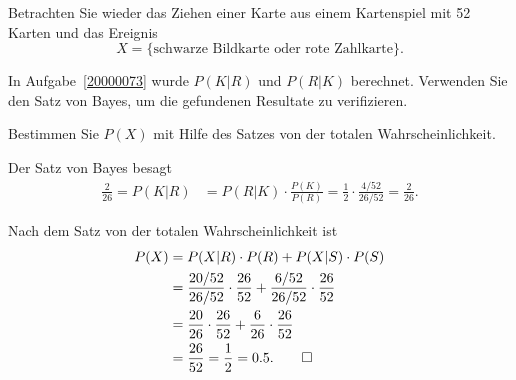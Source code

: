 Betrachten Sie wieder das Ziehen einer Karte aus einem Kartenspiel
mit 52 Karten und das Ereignis
\[
X
=
\{
\text{schwarze Bildkarte oder rote Zahlkarte}
\}.
\]

\begin{teilaufgaben}
\item
In Aufgabe~\ref{20000073} wurde $P(K|R)$ und $P(R|K)$ berechnet.
Verwenden Sie den Satz von Bayes, um die gefundenen Resultate zu
verifizieren.
\item
Bestimmen Sie $P(X)$ mit Hilfe des Satzes von der totalen Wahrscheinlichkeit.
\end{teilaufgaben}

\begin{loesung}
\begin{teilaufgaben}
\item
Der Satz von Bayes besagt
\begin{align*}
\frac{2}{26}
=
P(K|R)
&=
P(R|K)\cdot \frac{P(K)}{P(R)}
=
\frac{1}{2}
\cdot
\frac{4/52}{26/52}
=
\frac{2}{26}.
\end{align*}
\item
Nach dem Satz von der totalen Wahrscheinlichkeit ist
\begin{align*}
P(X)
&=
P(X|R) \cdot P(R) + P(X|S) \cdot P(S)
\\
&=
\frac{20/52}{26/52}\cdot \frac{26}{52}
+
\frac{6/52}{26/52}\cdot \frac{26}{52}
\\
&=
\frac{20}{26} \cdot \frac{26}{52}
+
\frac{6}{26} \cdot \frac{26}{52}
\\
&=
\frac{26}{52}
=
\frac{1}{2}
=
0.5.
\qedhere
\end{align*}
\end{teilaufgaben}
\end{loesung}
